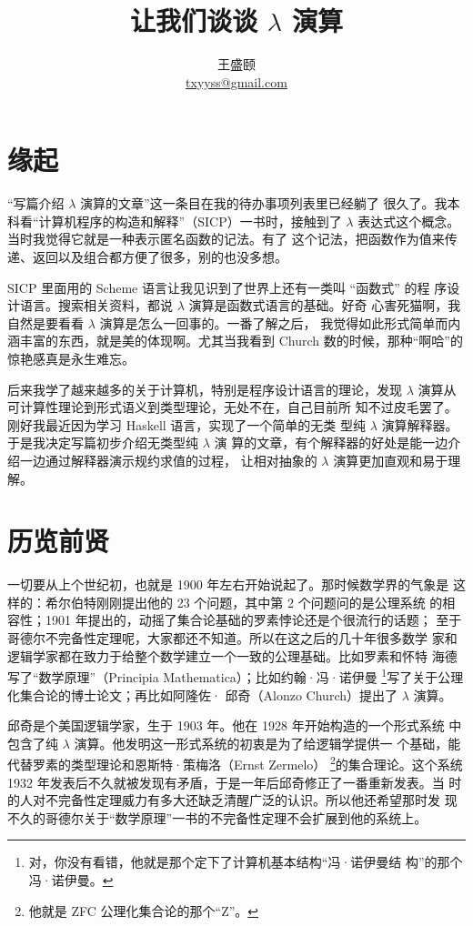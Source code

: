 \documentclass[a4paper,adobefonts]{ctexart}
\theoremstyle{definition}
\begin{document}
\title{{\bfseries 让我们谈谈 $\lambda$ 演算}}
\author{王盛颐\\\href{mailto:txyyss@gmail.com}{txyyss@gmail.com}}
\date{}
\maketitle

\section*{缘起}

``写篇介绍 $\lambda$ 演算的文章''这一条目在我的待办事项列表里已经躺了
很久了。我本科看``计算机程序的构造和解释''（SICP）一书时，接触到了
$\lambda$ 表达式这个概念。当时我觉得它就是一种表示匿名函数的记法。有了
这个记法，把函数作为值来传递、返回以及组合都方便了很多，别的也没多想。

SICP 里面用的 Scheme 语言让我见识到了世界上还有一类叫 ``函数式'' 的程
序设计语言。搜索相关资料，都说 $\lambda$ 演算是函数式语言的基础。好奇
心害死猫啊，我自然是要看看 $\lambda$ 演算是怎么一回事的。一番了解之后，
我觉得如此形式简单而内涵丰富的东西，就是美的体现啊。尤其当我看到
Church 数的时候，那种``啊哈''的惊艳感真是永生难忘。

后来我学了越来越多的关于计算机，特别是程序设计语言的理论，发现
$\lambda$ 演算从可计算性理论到形式语义到类型理论，无处不在，自己目前所
知不过皮毛罢了。刚好我最近因为学习 Haskell 语言，实现了一个简单的无类
型纯 $\lambda$ 演算解释器。于是我决定写篇初步介绍无类型纯 $\lambda$ 演
算的文章，有个解释器的好处是能一边介绍一边通过解释器演示规约求值的过程，
让相对抽象的 $\lambda$ 演算更加直观和易于理解。

\section{历览前贤}

一切要从上个世纪初，也就是 1900 年左右开始说起了。那时候数学界的气象是
这样的：希尔伯特刚刚提出他的 23 个问题，其中第 2 个问题问的是公理系统
的相容性；1901 年提出的，动摇了集合论基础的罗素悖论还是个很流行的话题；
至于哥德尔不完备性定理呢，大家都还不知道。所以在这之后的几十年很多数学
家和逻辑学家都在致力于给整个数学建立一个一致的公理基础。比如罗素和怀特
海德写了``数学原理''（Principia Mathematica）；比如约翰·冯·诺伊曼
\footnote{对，你没有看错，他就是那个定下了计算机基本结构``冯·诺伊曼结
  构''的那个冯·诺伊曼。}写了关于公理化集合论的博士论文；再比如阿隆佐·
邱奇（Alonzo Church）提出了 $\lambda$ 演算。

邱奇是个美国逻辑学家，生于 1903 年。他在 1928 年开始构造的一个形式系统
中包含了纯 $\lambda$ 演算。他发明这一形式系统的初衷是为了给逻辑学提供一
个基础，能代替罗素的类型理论和恩斯特·策梅洛（Ernst Zermelo）
\footnote{他就是 ZFC 公理化集合论的那个``Z''。}的集合理论。这个系统
1932 年发表后不久就被发现有矛盾，于是一年后邱奇修正了一番重新发表。当
时的人对不完备性定理威力有多大还缺乏清醒广泛的认识。所以他还希望那时发
现不久的哥德尔关于``数学原理''一书的不完备性定理不会扩展到他的系统上。
\end{document}
